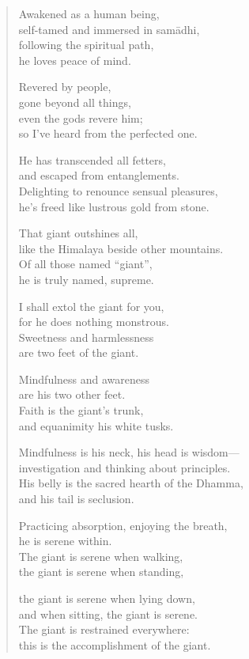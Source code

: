 \documentclass[12pt,openany]{book}%
\begin{document}
\begin{verse}%
Awakened as a human being, \\
self-tamed and immersed in \textsanskrit{samādhi}, \\
following the spiritual path, \\
he loves peace of mind. 

Revered by people, \\
gone beyond all things, \\
even the gods revere him; \\
so I’ve heard from the perfected one. 

He has transcended all fetters, \\
and escaped from entanglements. \\
Delighting to renounce sensual pleasures, \\
he’s freed like lustrous gold from stone. 

That giant outshines all, \\
like the Himalaya beside other mountains. \\
Of all those named “giant”, \\
he is truly named, supreme. 

I shall extol the giant for you, \\
for he does nothing monstrous. \\
Sweetness and harmlessness \\
are two feet of the giant. 

Mindfulness and awareness \\
are his two other feet. \\
Faith is the giant’s trunk, \\
and equanimity his white tusks. 

Mindfulness is his neck, his head is wisdom—\\
investigation and thinking about principles. \\
His belly is the sacred hearth of the Dhamma, \\
and his tail is seclusion. 

Practicing absorption, enjoying the breath, \\
he is serene within. \\
The giant is serene when walking, \\
the giant is serene when standing, 

the giant is serene when lying down, \\
and when sitting, the giant is serene. \\
The giant is restrained everywhere: \\
this is the accomplishment of the giant. 


\end{verse}
\end{document}
